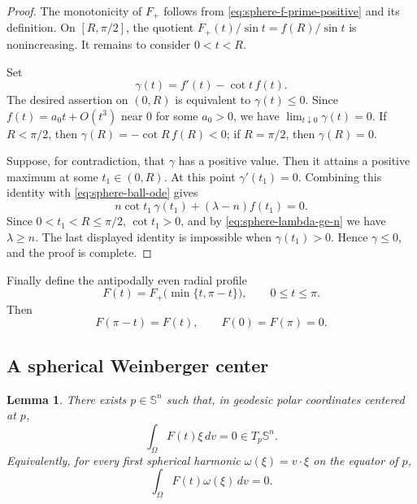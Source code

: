 \documentclass[10pt,a4paper]{amsart}
\newtheorem{lemma}[theorem]{Lemma}
\newcommand{\Sn}{\mathbb S}
\begin{document}
\begin{proof}
The monotonicity of $F_+$ follows from \eqref{eq:sphere-f-prime-positive} and its definition.  On $[R,\pi/2]$, the quotient $F_+(t)/\sin t=f(R)/\sin t$ is nonincreasing.  It remains to consider $0<t<R$.

Set
$$
        \gamma(t)=f'(t)-\cot t\,f(t).
$$
The desired assertion on $(0,R)$ is equivalent to $\gamma(t)\le0$.  Since $f(t)=a_0t+O(t^3)$ near $0$ for some $a_0>0$, we have $\lim_{t\downarrow0}\gamma(t)=0$.  If $R<\pi/2$, then $\gamma(R)=-\cot R\,f(R)<0$; if $R=\pi/2$, then $\gamma(R)=0$.

Suppose, for contradiction, that $\gamma$ has a positive value.  Then it attains a positive maximum at some $t_1\in(0,R)$.  At this point $\gamma'(t_1)=0$.  Combining this identity with \eqref{eq:sphere-ball-ode} gives
$$
        n\cot t_1\,\gamma(t_1)+(\lambda-n)f(t_1)=0.
$$
Since $0<t_1<R\le\pi/2$, $\cot t_1>0$, and by \eqref{eq:sphere-lambda-ge-n} we have $\lambda\ge n$.  The last displayed identity is impossible when $\gamma(t_1)>0$.  Hence $\gamma\le0$, and the proof is complete.
\end{proof}

Finally define the antipodally even radial profile
\begin{equation}\label{eq:sphere-F-even-def}
        F(t)=F_+\bigl(\min\{t,\pi-t\}\bigr),
        \qquad 0\le t\le\pi.
\end{equation}
Then
\begin{equation}\label{eq:sphere-F-even}
        F(\pi-t)=F(t),
        \qquad
        F(0)=F(\pi)=0.
\end{equation}

\subsection{A spherical Weinberger center}

\begin{lemma}\label{lem:sphere-center}
There exists $p\in\Sn^n$ such that, in geodesic polar coordinates centered at $p$,
\begin{equation}\label{eq:sphere-center}
        \int_\Omega F(t)\xi\,dv=0\in T_p\Sn^n.
\end{equation}
Equivalently, for every first spherical harmonic $\omega(\xi)=v\cdot\xi$ on the equator of $p$,
$$
        \int_\Omega F(t)\omega(\xi)\,dv=0.
$$
\end{lemma}
\end{document}
